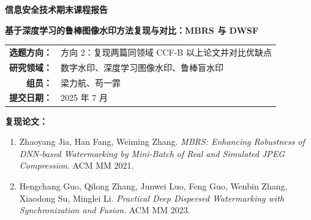 ﻿\documentclass[UTF8,zihao=5]{ctexart}
\begin{document}
\begin{titlepage}
\centering
\vspace*{1.5cm}
{\bfseries 信息安全技术期末课程报告\par}
\vspace{1.2cm}
{\bfseries 基于深度学习的鲁棒图像水印方法复现与对比：MBRS 与 DWSF\par}
\vspace{2.0cm}
\begin{tabular}{rl}
\textbf{选题方向：} & 方向 2：复现两篇同领域 CCF-B 以上论文并对比优缺点\\[0.35em]
\textbf{研究领域：} & 数字水印、深度学习图像水印、鲁棒盲水印\\[0.35em]
\textbf{组员：} & 梁力航、苟一霏\\[0.35em]
\textbf{提交日期：} & 2025 年 7 月\\
\end{tabular}
\vfill
\begin{flushleft}
\textbf{复现论文：}
\begin{enumerate}[leftmargin=2em]
\item Zhaoyang Jia, Han Fang, Weiming Zhang. \emph{MBRS: Enhancing Robustness of DNN-based Watermarking by Mini-Batch of Real and Simulated JPEG Compression}. ACM MM 2021.
\item Hengchang Guo, Qilong Zhang, Junwei Luo, Feng Guo, Wenbin Zhang, Xiaodong Su, Minglei Li. \emph{Practical Deep Dispersed Watermarking with Synchronization and Fusion}. ACM MM 2023.
\end{enumerate}
\end{flushleft}
\end{titlepage}
\begin{abstract}

数字水印技术是信息安全领域中面向版权保护、内容溯源和泄露追踪的重要技术。传统水印方法通常依赖 DCT、DWT 等人工设计的频域特征，在特定攻击下可以取得较好效果，但对复杂图像内容、组合失真和真实应用场景的适应性有限。随着深度学习的发展，基于编码器-噪声层-解码器的端到端图像水印方法逐渐成为鲁棒水印研究的重要方向。本文选择 ACM MM 2021 论文 MBRS 与 ACM MM 2023 论文 DWSF 作为复现对象。两者均属于深度学习鲁棒图像水印方法，但研究重点不同：MBRS 主要针对 JPEG 压缩这一非可微但实际高频出现的攻击，提出真实 JPEG、模拟 JPEG 与无噪声层混合的小批次训练策略；DWSF 则面向任意分辨率图像和复杂几何攻击，提出分散嵌入、水印同步和消息融合机制。

在复现过程中，我们基于两篇论文公开代码整理了统一的训练、评估和可视化流程，并在本地 Apple M4 + MPS 环境下完成轻量化复现实验。实验使用 128×128 图像块、随机二进制消息以及 PSNR、SSIM、BER 等标准评价指标，对两种方法在无攻击、JPEG 压缩、高斯模糊、高斯噪声、裁剪和亮度变化等多种攻击下的表现进行了对比。实验结果表明，MBRS 在无攻击图像质量和轻度 JPEG 压缩下表现更优，Clean 条件下 PSNR 达到 33.8 dB，BER 为 0；DWSF 参数量约为 MBRS 的五分之一，也能在 Clean 条件下实现 BER 为 0，并在部分亮度变化场景下表现更好。对于强压缩、强模糊和裁剪等更高强度扰动，两种模型呈现出不同的鲁棒性变化趋势，为分析水印嵌入策略和攻击适应性提供了实验依据。本文进一步分析了两种方法的结构差异、鲁棒性来源、复现结果和实际应用取舍，并总结了本次复现实验对深度水印系统设计的启示。


\end{abstract}
\clearpage
\tableofcontents
\clearpage
\end{document}
